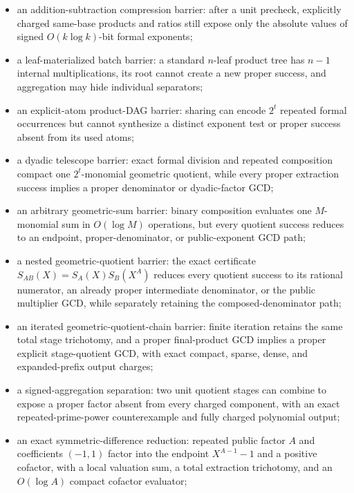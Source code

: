 \documentclass[11pt]{article}
\begin{document}
\begin{itemize}
  to arbitrary squareful and noninitial-support exponents of
  \(O(k\log k)\) bits in a common polynomial-size explicit schedule;
\item an addition-subtraction compression barrier: after a unit precheck,
  explicitly charged same-base products and ratios still expose only the
  absolute values of signed \(O(k\log k)\)-bit formal exponents;
\item a leaf-materialized batch barrier: a standard \(n\)-leaf product tree
  has \(n-1\) internal multiplications, its root cannot create a new proper
  success, and aggregation may hide individual separators;
\item an explicit-atom product-DAG barrier: sharing can encode \(2^t\)
  repeated formal occurrences but cannot synthesize a distinct exponent test
  or proper success absent from its used atoms;
\item a dyadic telescope barrier: exact formal division and repeated
  composition compact one \(2^t\)-monomial geometric quotient, while every
  proper extraction success implies a proper denominator or dyadic-factor
  GCD;
\item an arbitrary geometric-sum barrier: binary composition evaluates one
  \(M\)-monomial sum in \(O(\log M)\) operations, but every quotient success
  reduces to an endpoint, proper-denominator, or public-exponent GCD path;
\item a nested geometric-quotient barrier: the exact certificate
  \(S_{AB}(X)=S_A(X)S_B(X^A)\) reduces every quotient success to its rational
  numerator, an already proper intermediate denominator, or the public
  multiplier GCD, while separately retaining the composed-denominator path;
\item an iterated geometric-quotient-chain barrier: finite iteration retains
  the same total stage trichotomy, and a proper final-product GCD implies a
  proper explicit stage-quotient GCD, with exact compact, sparse, dense, and
  expanded-prefix output charges;
\item a signed-aggregation separation: two unit quotient stages can combine
  to expose a proper factor absent from every charged component, with an
  exact repeated-prime-power counterexample and fully charged polynomial
  output;
\item an exact symmetric-difference reduction: repeated public factor \(A\)
  and coefficients \((-1,1)\) factor into the endpoint
  \(X^{A-1}-1\) and a positive cofactor, with a local valuation sum, a total
  extraction trichotomy, and an \(O(\log A)\) compact cofactor evaluator;

\end{itemize}
\end{document}

